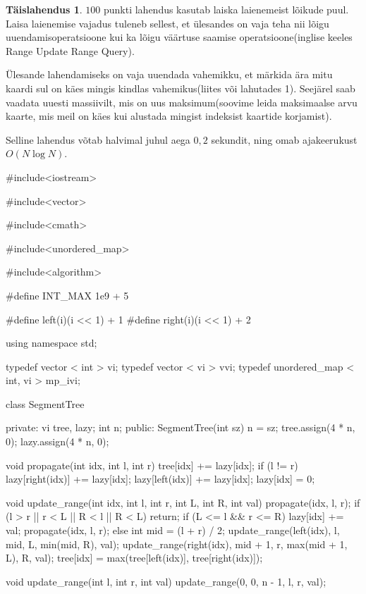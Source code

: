 \documentclass{trkut}
\theoremstyle{definition}
\newtheorem*{solution}{Täislahendus}
\begin{document}
\begin{solution}
$100$ punkti lahendus kasutab laiska laienemeist lõikude puul. 
Laisa laienemise vajadus tuleneb sellest, et ülesandes on vaja teha nii lõigu uuendamisoperatsioone kui ka lõigu väärtuse saamise operatsioone(inglise keeles Range Update Range Query).

Ülesande lahendamiseks on vaja uuendada vahemikku, et märkida ära mitu kaardi sul on käes mingis kindlas vahemikus(liites või lahutades 1).
Seejärel saab vaadata uuesti massiivilt, mis on uus maksimum(soovime leida maksimaalse arvu kaarte, mis meil on käes kui alustada mingist indeksist kaartide korjamist).

Selline lahendus võtab halvimal juhul aega $0,2$ sekundit, ning omab ajakeerukust $O(N\log N)$.
\end{solution}
\begin{cclol}
#include<iostream>

#include<vector>

#include<cmath>

#include<unordered_map>

#include<algorithm>

#define INT_MAX 1e9 + 5

#define left(i)(i << 1) + 1
#define right(i)(i << 1) + 2

using namespace std;

typedef vector < int > vi;
typedef vector < vi > vvi;
typedef unordered_map < int, vi > mp_ivi;

class SegmentTree {
  private: vi tree,
  lazy;
  int n;
  public: SegmentTree(int sz) {
    n = sz;
    tree.assign(4 * n, 0);
    lazy.assign(4 * n, 0);
  }

  void propagate(int idx, int l, int r) {
    tree[idx] += lazy[idx];
    if (l != r) {
      lazy[right(idx)] += lazy[idx];
      lazy[left(idx)] += lazy[idx];
    }
    lazy[idx] = 0;
  }

  void update_range(int idx, int l, int r, int L, int R, int val) {
    propagate(idx, l, r);
    if (l > r || r < L || R < l || R < L) return;
    if (L <= l && r <= R) {
      lazy[idx] += val;
      propagate(idx, l, r);
    } else {
      int mid = (l + r) / 2;
      update_range(left(idx), l, mid, L, min(mid, R), val);
      update_range(right(idx), mid + 1, r, max(mid + 1, L), R, val);
      tree[idx] = max(tree[left(idx)], tree[right(idx)]);
    }
  }

  void update_range(int l, int r, int val) {
    update_range(0, 0, n - 1, l, r, val);
  }

}
\end{cclol}
\end{document}
